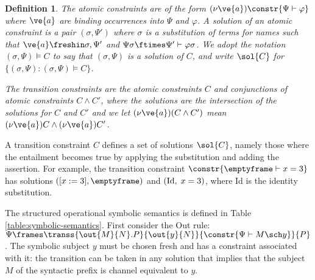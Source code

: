 \documentclass{eptcs}
\newtheorem{definition}{Definition}
\theoremstyle{definition}
\begin{document}
\begin{definition}
The {\em atomic constraints} are of the form
$(\nu \ve{a})\constr{\Psi \vdash \varphi}$ where $\ve{a}$ are binding
occurrences into $\Psi$ and $\varphi$. A {\em solution} of an
atomic constraint is a pair $(\sigma, \Psi')$ where $\sigma$ is a
substitution of terms for names such that $\ve{a} \freshin \sigma, \Psi'$ and
$\Psi\sigma \ftimes \Psi' \vdash \varphi\sigma$. We adopt the notation $(\sigma,
\Psi) \models C$ to say that $(\sigma, \Psi)$ is a solution of $C$, and write
$\sol{C}$ for $\{(\sigma, \Psi): (\sigma, \Psi) \models C\}$.

The {\em transition constraints} are the atomic
constraints $C$ and conjunctions of atomic constraints $C \wedge C'$, where the
solutions are the intersection of the solutions for $C$ and $C'$ and we let
$(\nu \ve{a})(C \wedge C')$ mean $(\nu
\ve{a})C \wedge (\nu \ve{a})C'$.
\end{definition}
A transition constraint $C$ defines a set of solutions $\sol{C}$,
namely those where the entailment becomes true by applying the substitution and
adding the assertion.
For example, the transition constraint $\constr{\emptyframe \vdash x=3}$ has
solutions $([x:=3], \emptyframe)$ and $({\rm Id},\; x=3)$, where Id is the
identity substitution.

The structured operational symbolic
semantics is defined in Table \ref{table:symbolic-semantics}.
First consider
the {\sc Out} rule:
$\Psi \frames \transs{\out{M}{N}.P}{\out{y}{N}}{\constr{\Psi \vdash M \sch
y}}{P}$.
The symbolic subject $y$ must be chosen fresh and has a constraint
associated with it: the transition can be taken in any solution that implies
that the subject $M$ of the syntactic prefix is channel equivalent to $y$.
\end{document}
